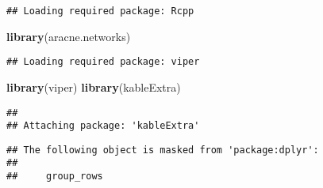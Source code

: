 \documentclass[]{article}
\newenvironment{Shaded}{\begin{snugshade}}{\end{snugshade}}
\newcommand{\KeywordTok}[1]{\textcolor[rgb]{0.13,0.29,0.53}{\textbf{#1}}}
\newcommand{\NormalTok}[1]{#1}
\begin{document}
\begin{verbatim}
## Loading required package: Rcpp
\end{verbatim}

\begin{Shaded}
\begin{Highlighting}[]
\KeywordTok{library}\NormalTok{(aracne.networks)}
\end{Highlighting}
\end{Shaded}

\begin{verbatim}
## Loading required package: viper
\end{verbatim}

\begin{Shaded}
\begin{Highlighting}[]
\KeywordTok{library}\NormalTok{(viper)}
\KeywordTok{library}\NormalTok{(kableExtra)}
\end{Highlighting}
\end{Shaded}

\begin{verbatim}
## 
## Attaching package: 'kableExtra'
\end{verbatim}

\begin{verbatim}
## The following object is masked from 'package:dplyr':
## 
##     group_rows
\end{verbatim}
\end{document}
